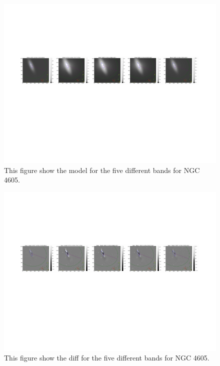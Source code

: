 \documentclass[12pt,preprint,pdftex]{aastex}
\begin{document}
\begin{figure}
\centering
\includegraphics[trim = .9cm 4.5cm 0cm 2.9cm,clip=true,width=\textwidth] {goodsingle-colors-model.pdf}
\caption{This figure show the model for the five different bands for NGC 4605.}
\label{fig:colorsmodel}
\end{figure}
\begin{figure}
\centering
\includegraphics[trim = .9cm 4.5cm 0cm 2.9cm,clip=true,width=\textwidth] {goodsingle-colors-diff.pdf}
\caption{This figure show the diff for the five different bands for NGC 4605.}
\label{fig:colorsdiff}
\end{figure}
\end{document}
